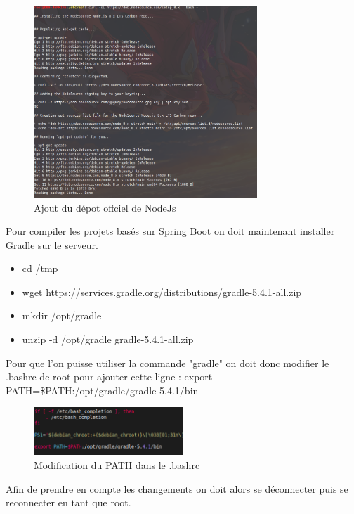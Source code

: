 \documentclass[report]{BetterDocument}
\begin{document}
		\begin{figure}[H]
			\centering\includegraphics[width=0.75\textwidth, keepaspectratio]{res/install-npm.png}
			\caption{Ajout du dépot offciel de NodeJs}
		\end{figure}

		Pour compiler les projets basés sur Spring Boot on doit maintenant installer Gradle sur le serveur.

		\begin{itemize}
			\item{cd /tmp}
			\item{wget https://services.gradle.org/distributions/gradle-5.4.1-all.zip}
 			\item{mkdir /opt/gradle}
			\item{unzip -d /opt/gradle gradle-5.4.1-all.zip}
		\end{itemize}

		Pour que l'on puisse utiliser la commande "gradle" on doit donc modifier le .bashrc de root pour ajouter cette ligne :
		export PATH=\$PATH:/opt/gradle/gradle-5.4.1/bin

		\begin{figure}[H]
			\centering\includegraphics[width=0.5\textwidth, keepaspectratio]{res/bashrc-path.png}
			\caption{Modification du PATH dans le .bashrc}
		\end{figure}

		Afin de prendre en compte les changements on doit alors se déconnecter puis se reconnecter en tant que root.
\end{document}
